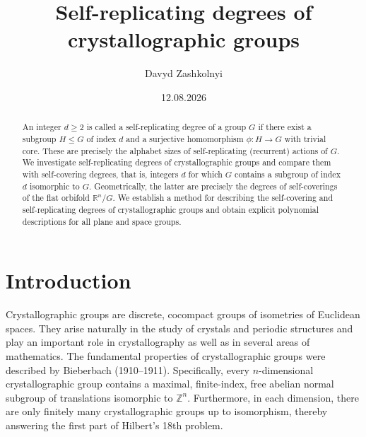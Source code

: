 \documentclass[draft]{adm-paper}
\title{Self-replicating degrees of crystallographic groups}
\author{Davyd Zashkolnyi}
\date{12.08.2026}
\theoremstyle{definition}
\begin{document}
\maketitle
\begin{abstract}
  An integer $d\geq 2$ is called a self-replicating degree of a group $G$ if there exist a subgroup $H\leq G$ of index
  $d$ and a surjective homomorphism $\phi:H\rightarrow G$ with trivial core. These are precisely the alphabet sizes of
  self-replicating (recurrent) actions of $G$. We investigate self-replicating degrees of crystallographic groups and
  compare them with self-covering degrees, that is, integers $d$ for which $G$ contains a subgroup of index $d$
  isomorphic to $G$. Geometrically, the latter are precisely the degrees of self-coverings of the flat orbifold
  $\mathbb{R}^n/G$. We establish a method for describing the self-covering and self-replicating degrees of
  crystallographic groups and obtain explicit polynomial descriptions for all plane and space groups.
\end{abstract}





\section*{Introduction}

Crystallographic groups are discrete, cocompact groups of isometries of Euclidean spaces. They arise naturally in the
study of crystals and periodic structures and play an important role in crystallography as well as in several areas
of mathematics. The fundamental properties of crystallographic groups were described by Bieberbach (1910--1911).
Specifically, every $n$-dimensional crystallographic group contains a maximal, finite-index, free abelian normal
subgroup of translations isomorphic to $\mathbb{Z}^n$. Furthermore, in each dimension, there are only finitely many
crystallographic groups up to isomorphism, thereby answering the first part of Hilbert's 18th problem.
\end{document}
